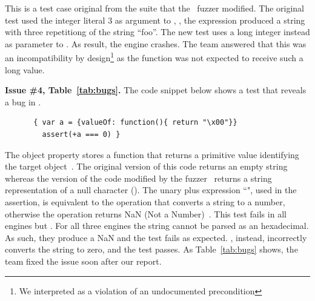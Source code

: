 \documentclass[smallextended]{svjour3}
\begin{document}
This is a test case original from the \jsc suite that the
\radamsa\ fuzzer modified. The original test used the integer literal
3 as argument to , \ie{}, the expression produced a
string with three repetitiong of the string ``foo''. The new test uses
a long integer instead as parameter to . As result,
the engine crashes. The team answered that this was an incompatibility
by design\footnote{We interpreted as a violation of an undocumented
  precondition} as the function was not expected to receive such a
long value.


\vspace{1ex}\noindent\textbf{Issue \#4, Table~\ref{tab:bugs}.} The
code snippet below shows a test that reveals a bug in \textbf{\chakra}.

\begin{figure}[h!]
  \vspace{-1ex}
  \centering
  \scriptsize
  \begin{lstlisting}
 { var a = {valueOf: function(){ return "\x00"}}
   assert(+a === 0) }
  \end{lstlisting}
  \normalsize
  \vspace{-1ex}
\end{figure}

The object property  stores a function that returns a
primitive value identifying the target object~\cite{valueof}. The
original version of this code returns an empty string whereas the
version of the code modified by the \radamsa{} fuzzer~\cite{radamsa}
returns a string representation of a null character
(). The unary plus expression
``", used in the assertion, is equivalent to the operation
 that converts a string to a number,
otherwise the operation returns NaN (Not a
Number)~\cite{unary-plus}. This test fails in all engines but
\chakra{}. For all three engines the string cannot be parsed as an
hexadecimal. As such, they produce a NaN and the test fails as
expected. \chakra{}, instead, incorrectly converts the string to zero,
and the test passes. As Table~\ref{tab:bugs} shows, the \chakra{} team
fixed the issue soon after our report.
\end{document}
